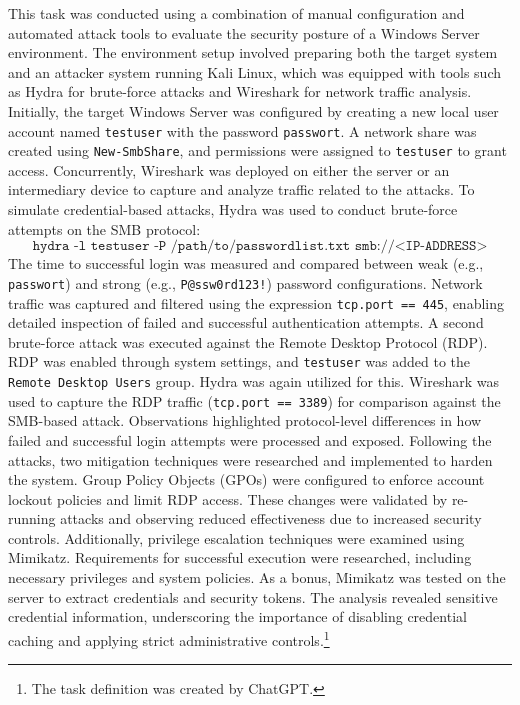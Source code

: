 \documentclass[a4paper]{article}
\newcommand{\abc}{\hfill \break}
\begin{document}
This task was conducted using a combination of manual configuration and automated attack tools to evaluate the security posture of a Windows Server environment. The environment setup involved preparing both the target system and an attacker system running Kali Linux, which was equipped with tools such as Hydra for brute-force attacks and Wireshark for network traffic analysis. \abc
Initially, the target Windows Server was configured by creating a new local user account named \texttt{testuser} with the password \texttt{passwort}. A network share was created using \texttt{New-SmbShare}, and permissions were assigned to \texttt{testuser} to grant access. Concurrently, Wireshark was deployed on either the server or an intermediary device to capture and analyze traffic related to the attacks.\abc
To simulate credential-based attacks, Hydra was used to conduct brute-force attempts on the SMB protocol:
\[
\texttt{hydra -l testuser -P /path/to/passwordlist.txt smb://<IP-ADDRESS>}
\]
The time to successful login was measured and compared between weak (e.g., \texttt{passwort}) and strong (e.g., \texttt{P@ssw0rd123!}) password configurations. Network traffic was captured and filtered using the expression \texttt{tcp.port == 445}, enabling detailed inspection of failed and successful authentication attempts. \abc
A second brute-force attack was executed against the Remote Desktop Protocol (RDP). RDP was enabled through system settings, and \texttt{testuser} was added to the \texttt{Remote Desktop Users} group. Hydra was again utilized for this.
Wireshark was used to capture the RDP traffic (\texttt{tcp.port == 3389}) for comparison against the SMB-based attack. Observations highlighted protocol-level differences in how failed and successful login attempts were processed and exposed.\abc
Following the attacks, two mitigation techniques were researched and implemented to harden the system. Group Policy Objects (GPOs) were configured to enforce account lockout policies and limit RDP access. These changes were validated by re-running attacks and observing reduced effectiveness due to increased security controls.\abc
Additionally, privilege escalation techniques were examined using Mimikatz. Requirements for successful execution were researched, including necessary privileges and system policies. As a bonus, Mimikatz was tested on the server to extract credentials and security tokens. The analysis revealed sensitive credential information, underscoring the importance of disabling credential caching and applying strict administrative controls.\footnote{The task definition was created by ChatGPT.}
\end{document}
